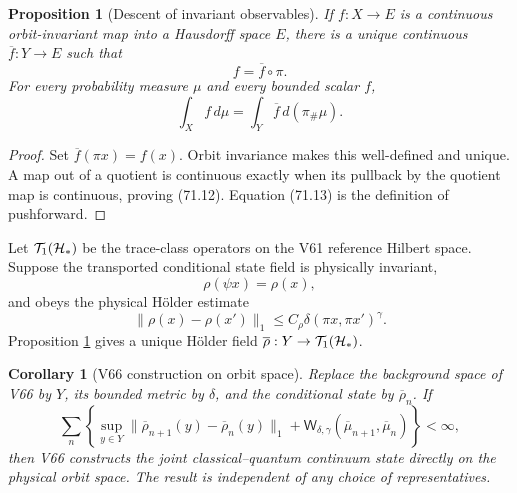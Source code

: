 \documentclass[11pt]{article}
\newtheorem{proposition}[theorem]{Proposition}
\newtheorem{corollary}[theorem]{Corollary}
\theoremstyle{remark}
\begin{document}
\begin{proposition}[Descent of invariant observables]
\label{prop:v12v71-observable-descent}
If \(f:X\to E\) is a continuous orbit-invariant map into a Hausdorff
space \(E\), there is a unique continuous
\(\overline f:Y\to E\) such that
\[
                              f=\overline f\circ\pi.          \tag{71.12}
\]
For every probability measure \(\mu\) and every bounded scalar
\(f\),
\begin{equation}
                  \int_X f\,d\mu
                  =\int_Y\overline f\,d(\pi_\#\mu).          \tag{71.13}
\end{equation}
\end{proposition}

\begin{proof}
Set \(\overline f(\pi x)=f(x)\).  Orbit invariance makes this
well-defined and unique.  A map out of a quotient is continuous
exactly when its pullback by the quotient map is continuous, proving
(71.12).  Equation (71.13) is the definition of pushforward.
\end{proof}

Let \({\cal T}_1({\cal H}_*)\) be the trace-class operators on the V61
reference Hilbert space.  Suppose the transported conditional state
field is physically invariant,
\[
                         \rho(\psi x)=\rho(x),                \tag{71.14}
\]
and obeys the physical Hölder estimate
\begin{equation}
 \|\rho(x)-\rho(x')\|_1
 \leq C_\rho\delta(\pi x,\pi x')^\gamma.                     \tag{71.15}
\end{equation}
Proposition \ref{prop:v12v71-observable-descent} gives a unique
Hölder field \(\overline\rho:Y\to{\cal T}_1({\cal H}_*)\).

\begin{corollary}[V66 construction on orbit space]
\label{cor:v12v71-joint-quotient}
Replace the background space of V66 by \(Y\), its bounded metric by
\(\delta\), and the conditional state by
\(\overline\rho_n\).  If
\begin{equation}
 \sum_n\left\{
 \sup_{y\in Y}\|\overline\rho_{n+1}(y)-\overline\rho_n(y)\|_1
 +{\mathsf W}_{\delta,\gamma}
       (\overline\mu_{n+1},\overline\mu_n)\right\}<\infty,    \tag{71.16}
\end{equation}
then V66 constructs the joint classical--quantum continuum state
directly on the physical orbit space.  The result is independent of
any choice of representatives.
\end{corollary}
\end{document}
